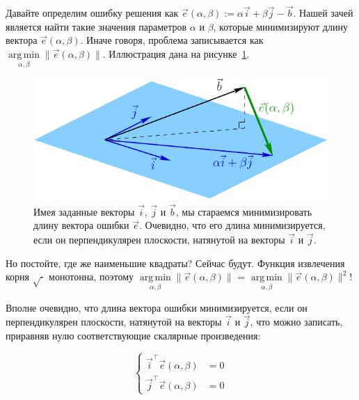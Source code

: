 \documentclass[notitlepage]{report}
\DeclareMathOperator*{\argmin}{arg\,min}
\begin{document}
Давайте определим ошибку решения как $\vec{e}(\alpha, \beta) :=  \alpha \vec{i} + \beta\vec{j} - \vec b$.
Нашей зачей является найти такие значения параметров $\alpha$ и $\beta$, которые минимизируют длину вектора $\vec{e}(\alpha, \beta)$. Иначе говоря, проблема записывается как $\argmin\limits_{\alpha, \beta} \|\vec{e}(\alpha, \beta)\|$.
Иллюстрация дана на рисунке~\ref{fig:error}.

\begin{figure}[ht]
	\centering
	\includegraphics[width=.7\linewidth]{error}
	\caption{Имея заданные векторы $\vec i$, $\vec j$ и $\vec b$, мы стараемся минимизировать длину вектора ошибки $\vec e$. Очевидно, что его длина минимизируется, если он перпендикулярен плоскости, натянутой на векторы $\vec i$ и $\vec j$.}
	\label{fig:error}
\end{figure}

Но постойте, где же наименьшие квадраты? Сейчас будут. Функция извлечения корня $\sqrt{\cdot}$ монотонна, поэтому $\argmin\limits_{\alpha, \beta} \|\vec{e}(\alpha, \beta)\|$ = $\argmin\limits_{\alpha, \beta} \|\vec{e}(\alpha, \beta)\|^2$!

Вполне очевидно, что длина вектора ошибки минимизируется, если он перпендикулярен плоскости, натянутой на векторы $\vec i$ и $\vec j$, что можно записать, приравняв нулю соответствующие скалярные произведения:

$$
\left\{
\begin{split}\vec{i}^\top \vec{e}(\alpha, \beta) &= 0\\
\vec{j}^\top \vec{e}(\alpha, \beta) &= 0
\end{split}
\right.
$$
\end{document}
